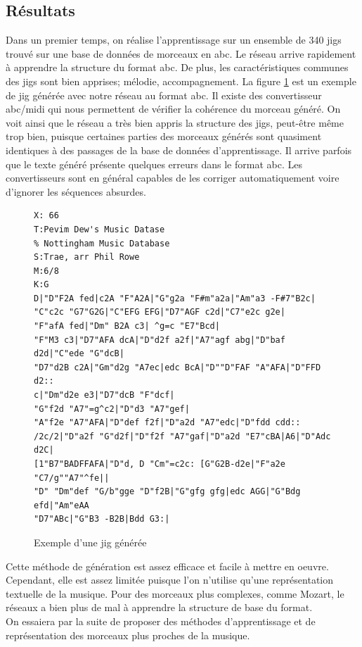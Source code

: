 \subsection{Résultats}
Dans un premier temps, on réalise l'apprentissage sur un ensemble de 340 jigs trouvé sur une base de données de morceaux en abc. Le réseau arrive rapidement à apprendre la structure du format abc. De plus, les caractéristiques communes des jigs sont bien apprises; mélodie, accompagnement. La figure \ref{jig_generee_abc} est un exemple de jig générée avec notre réseau au format abc. Il existe des convertisseur abc/midi qui nous permettent de vérifier la cohérence du morceau généré. On voit ainsi que le réseau a très bien appris la structure des jigs, peut-être même trop bien, puisque certaines parties des morceaux générés sont quasiment identiques à des passages de la base de données d'apprentissage. Il arrive parfois que le texte généré présente quelques erreurs dans le format abc. Les convertisseurs sont en général capables de les corriger automatiquement voire d'ignorer les séquences absurdes.

\begin{figure}[!h]
\begin{verbatim}
X: 66
T:Pevim Dew's Music Datase
% Nottingham Music Database
S:Trae, arr Phil Rowe
M:6/8
K:G
D|"D"F2A fed|c2A "F"A2A|"G"g2a "F#m"a2a|"Am"a3 -F#7"B2c|
"C"c2c "G7"G2G|"C"EFG EFG|"D7"AGF c2d|"C7"e2c g2e|
"F"afA fed|"Dm" B2A c3| ^g=c "E7"Bcd|
"F"M3 c3|"D7"AFA dcA|"D"d2f a2f|"A7"agf abg|"D"baf d2d|"C"ede "G"dcB|
"D7"d2B c2A|"Gm"d2g "A7ec|edc BcA|"D""D"FAF "A"AFA|"D"FFD d2::
c|"Dm"d2e e3|"D7"dcB "F"dcf|
"G"f2d "A7"=g^c2|"D"d3 "A7"gef|
"A"f2e "A7"AFA|"D"def f2f|"D"a2d "A7"edc|"D"fdd cdd::
/2c/2|"D"a2f "G"d2f|"D"f2f "A7"gaf|"D"a2d "E7"cBA|A6|"D"Adc d2C|
[1"B7"BADFFAFA|"D"d, D "Cm"=c2c: [G"G2B-d2e|"F"a2e "C7/g""A7"^fe||
"D" "Dm"def "G/b"gge "D"f2B|"G"gfg gfg|edc AGG|"G"Bdg efd|"Am"eAA 
"D7"ABc|"G"B3 -B2B|Bdd G3:|
\end{verbatim}
\caption{Exemple d'une jig générée}
\label{jig_generee_abc}
\end{figure}

Cette méthode de génération est assez efficace et facile à mettre en oeuvre. Cependant, elle est assez limitée puisque l'on n'utilise qu'une représentation textuelle de la musique. Pour des morceaux plus complexes, comme Mozart, le réseaux a bien plus de mal à apprendre la structure de base du format. \\
On essaiera par la suite de proposer des méthodes d'apprentissage et de représentation des morceaux plus proches de la musique.

